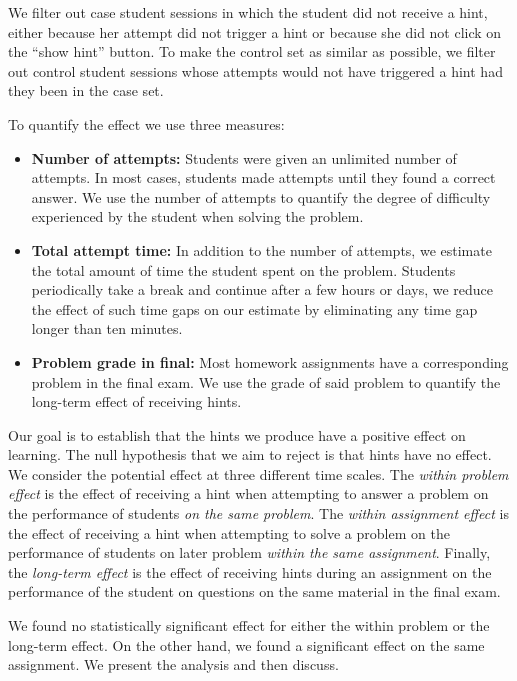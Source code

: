 \documentclass{llncs2e/llncs}
\begin{document}
We filter out case student sessions in which the student did not receive a hint, either because her attempt did not trigger a hint or because she did not click on the ``show hint'' button.  To make the control set as similar as possible, we filter out control student sessions whose attempts would not have triggered a hint had they been in the case set.

To quantify the effect we use three measures:
\begin{itemize}
\item {\bf Number of attempts:} Students were given an unlimited number of attempts. In most cases, students made attempts until they found a correct answer. We use the number of attempts to quantify the degree of difficulty experienced by the student when solving the problem.

\item {\bf Total attempt time:} In addition to the number of attempts, we estimate the total amount of time the student spent on the problem. Students periodically take a break and continue after a few hours or days, we reduce the effect of such time gaps on our estimate by eliminating any time gap longer than ten minutes.

\item {\bf Problem grade in final:} Most homework assignments have a corresponding problem in the final exam. We use the grade of said problem to quantify the long-term effect of receiving hints. 
\end{itemize}

Our goal is to establish that the hints we produce have a positive effect on learning. The null hypothesis that we aim to reject is that hints have no effect. We consider the potential effect at three different time scales. The {\em within problem effect} is the effect of receiving a hint when attempting to answer a problem on the performance of students {\em on the same problem}. The {\em within assignment effect} is the effect of receiving a hint when attempting to solve a problem on the performance of students on later problem {\em within the same assignment}. Finally, the {\em long-term effect} is the effect of receiving hints during an assignment on the performance of the student on questions on the same material in the final exam.

We found no statistically significant effect for either the within problem or the long-term effect. On the other hand, we found a significant effect on the same assignment. We present the analysis and then discuss.
\end{document}
